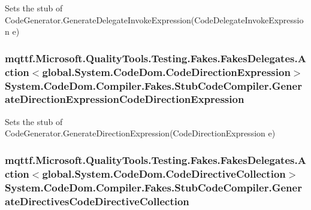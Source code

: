 Sets the stub of Code\-Generator.\-Generate\-Delegate\-Invoke\-Expression(\-Code\-Delegate\-Invoke\-Expression e)

\hypertarget{class_system_1_1_code_dom_1_1_compiler_1_1_fakes_1_1_stub_code_compiler_a43cd0a7e12ffb3f49a4147504d61c5cb}{
\subsubsection[{Generate\-Direction\-Expression\-Code\-Direction\-Expression}]{\setlength{\rightskip}{0pt plus 5cm}mqttf.\-Microsoft.\-Quality\-Tools.\-Testing.\-Fakes.\-Fakes\-Delegates.\-Action$<$global.\-System.\-Code\-Dom.\-Code\-Direction\-Expression$>$ System.\-Code\-Dom.\-Compiler.\-Fakes.\-Stub\-Code\-Compiler.\-Generate\-Direction\-Expression\-Code\-Direction\-Expression}}\label{class_system_1_1_code_dom_1_1_compiler_1_1_fakes_1_1_stub_code_compiler_a43cd0a7e12ffb3f49a4147504d61c5cb}


Sets the stub of Code\-Generator.\-Generate\-Direction\-Expression(\-Code\-Direction\-Expression e)

\hypertarget{class_system_1_1_code_dom_1_1_compiler_1_1_fakes_1_1_stub_code_compiler_a7649a2a32604ea40ac259613e445a50b}{
\subsubsection[{Generate\-Directives\-Code\-Directive\-Collection}]{\setlength{\rightskip}{0pt plus 5cm}mqttf.\-Microsoft.\-Quality\-Tools.\-Testing.\-Fakes.\-Fakes\-Delegates.\-Action$<$global.\-System.\-Code\-Dom.\-Code\-Directive\-Collection$>$ System.\-Code\-Dom.\-Compiler.\-Fakes.\-Stub\-Code\-Compiler.\-Generate\-Directives\-Code\-Directive\-Collection}}\label{class_system_1_1_code_dom_1_1_compiler_1_1_fakes_1_1_stub_code_compiler_a7649a2a32604ea40ac259613e445a50b}


